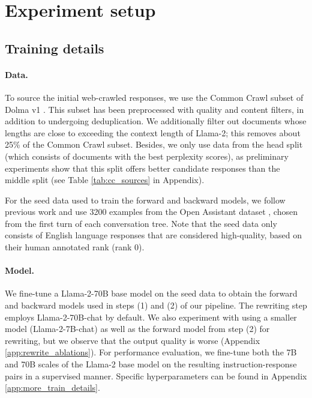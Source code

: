 \vspace{-0.25em}
\section{Experiment setup}
\subsection{Training details}
\vspace{-0.25em}
\paragraph{Data.} To source the initial web-crawled responses, we use the Common Crawl subset of Dolma v1 \cite{dolma}. This subset has been preprocessed with quality and content filters, in addition to undergoing deduplication. We additionally filter out documents whose lengths are close to exceeding the context length of Llama-2; this removes about 25\% of the Common Crawl subset. Besides, we only use data from the head split (which consists of documents with the best perplexity scores), as preliminary experiments show that this split offers better candidate responses than the middle split (see Table \ref{tab:cc_sources} in Appendix).

For the seed data used to train the forward and backward models, we follow previous work \cite{li2023self} and use 3200 examples from the Open Assistant dataset \cite{kopf2024openassistant}, chosen from the first turn of each conversation tree. Note that the seed data only consists of English language responses that are considered high-quality, based on their human annotated rank (rank 0).
\vspace{-0.25em}
\paragraph{Model.} We fine-tune a Llama-2-70B base model \cite{touvron2023llama2} on the seed data to obtain the forward and backward models used in steps (1) and (2) of our pipeline. The rewriting step employs Llama-2-70B-chat by default. We also experiment with using a smaller model (Llama-2-7B-chat) as well as the forward model from step (2) for rewriting, but we observe that the output quality is worse (Appendix \ref{app:rewrite_ablations}).
For performance evaluation, we fine-tune both the 7B and 70B scales of the Llama-2 base model on the resulting instruction-response pairs in a supervised manner. Specific hyperparameters can be found in Appendix \ref{app:more_train_details}.
\vspace{-0.25em}
